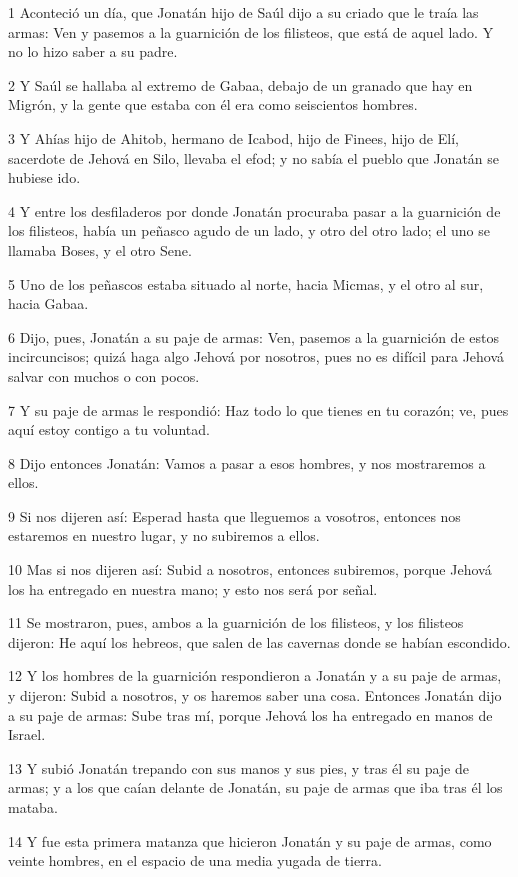 \par 1 Aconteció un día, que Jonatán hijo de Saúl dijo a su criado que le traía las armas: Ven y pasemos a la guarnición de los filisteos, que está de aquel lado. Y no lo hizo saber a su padre.
\par 2 Y Saúl se hallaba al extremo de Gabaa, debajo de un granado que hay en Migrón, y la gente que estaba con él era como seiscientos hombres.
\par 3 Y Ahías hijo de Ahitob, hermano de Icabod, hijo de Finees, hijo de Elí, sacerdote de Jehová en Silo, llevaba el efod; y no sabía el pueblo que Jonatán se hubiese ido.
\par 4 Y entre los desfiladeros por donde Jonatán procuraba pasar a la guarnición de los filisteos, había un peñasco agudo de un lado, y otro del otro lado; el uno se llamaba Boses, y el otro Sene.
\par 5 Uno de los peñascos estaba situado al norte, hacia Micmas, y el otro al sur, hacia Gabaa.
\par 6 Dijo, pues, Jonatán a su paje de armas: Ven, pasemos a la guarnición de estos incircuncisos; quizá haga algo Jehová por nosotros, pues no es difícil para Jehová salvar con muchos o con pocos.
\par 7 Y su paje de armas le respondió: Haz todo lo que tienes en tu corazón; ve, pues aquí estoy contigo a tu voluntad.
\par 8 Dijo entonces Jonatán: Vamos a pasar a esos hombres, y nos mostraremos a ellos.
\par 9 Si nos dijeren así: Esperad hasta que lleguemos a vosotros, entonces nos estaremos en nuestro lugar, y no subiremos a ellos.
\par 10 Mas si nos dijeren así: Subid a nosotros, entonces subiremos, porque Jehová los ha entregado en nuestra mano; y esto nos será por señal.
\par 11 Se mostraron, pues, ambos a la guarnición de los filisteos, y los filisteos dijeron: He aquí los hebreos, que salen de las cavernas donde se habían escondido.
\par 12 Y los hombres de la guarnición respondieron a Jonatán y a su paje de armas, y dijeron: Subid a nosotros, y os haremos saber una cosa. Entonces Jonatán dijo a su paje de armas: Sube tras mí, porque Jehová los ha entregado en manos de Israel.
\par 13 Y subió Jonatán trepando con sus manos y sus pies, y tras él su paje de armas; y a los que caían delante de Jonatán, su paje de armas que iba tras él los mataba.
\par 14 Y fue esta primera matanza que hicieron Jonatán y su paje de armas, como veinte hombres, en el espacio de una media yugada de tierra.
